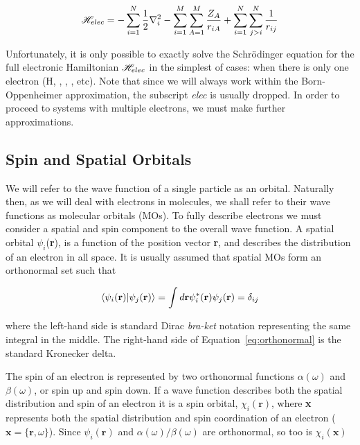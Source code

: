 \begin{equation}
  \mathscr{H}_{elec} = -\sum_{i=1}^N \frac{1}{2}\nabla_i^2  -\sum_{i=1}^M\sum_{A=1}^M\frac{Z_A}{r_{iA}}
  + \sum_{i=1}^N\sum_{j>i}^N \frac{1}{r_{ij}}
\label{eq:hamelect}
\end{equation}

\noindent Unfortunately, it is only possible to exactly solve the Schr{\"o}dinger equation for the full electronic Hamiltonian $\mathscr{H}_{elec}$ in the simplest of cases: when there is only one electron (H, , , , etc). Note that since we will always work within the Born-Oppenheimer approximation, the subscript \emph{elec} is usually dropped.  In order to proceed to systems with multiple electrons, we must make further approximations.

\subsection{Spin and Spatial Orbitals}

We will refer to the wave function of a single particle as an orbital. Naturally then, as we will deal with electrons in molecules, we shall refer to their wave functions as molecular orbitals (MOs). To fully describe electrons we must consider a spatial and spin component to the overall wave function. A spatial orbital $\psi_i$(\textbf{r}), is a function of the position vector \textbf{r}, and describes the distribution of an electron in all space. It is usually assumed that spatial MOs form an orthonormal set such that

\begin{equation}
\bra{\psi_i(\mathbf{r})}\ket{\psi_j(\mathbf{r})} =
\int d\mathbf{r} \psi_i^*(\mathbf{r})\psi_j(\mathbf{r}) = \delta_{ij}
\label{eq:orthonormal}
\end{equation}

\noindent where the left-hand side is standard Dirac \emph{bra-ket} notation representing the same integral in the middle. The right-hand side of Equation~\ref{eq:orthonormal} is the standard Kronecker delta.

The spin of an electron is represented by two orthonormal functions $\alpha(\omega)$ and $\beta(\omega)$, or spin up and spin down. If a wave function describes both the spatial distribution and spin of an electron it is a spin orbital, $\chi_i(\mathbf{r})$, where \textbf{x} represents both the spatial distribution and spin coordination of an electron ($\mathbf{x} = \{ \mathbf{r}, \omega \}$). Since $\psi_i(\mathbf{r})$ and $\alpha(\omega)/\beta(\omega)$ are orthonormal, so too is $\chi_i(\mathbf{x})$

